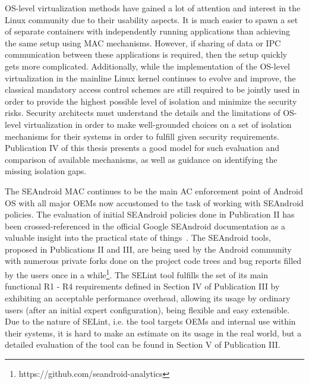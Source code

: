 OS-level virtualization methods have gained a lot of attention and interest in the Linux community due to their usability aspects. It is much easier to spawn a set of separate containers with independently running applications than achieving the same setup using MAC mechanisms. However, if sharing of data or IPC communication between these applications is required, then the setup quickly gets more complicated. Additionally, while the implementation of the OS-level virtualization in the mainline Linux kernel continues to evolve and improve, the classical mandatory access control schemes are still required to be jointly used in order to provide the highest possible level of isolation and minimize the security risks. Security architects must understand the details and the limitations of OS-level virtualization in order to make well-grounded choices on a set of isolation mechanisms for their systems in order to fulfill given security requirements. Publication IV of this thesis presents a good model for such evaluation and comparison of available mechanisms, as well as guidance on identifying the missing isolation gaps. 

The SEAndroid MAC continues to be the main AC enforcement point of Android OS with all major OEMs now accustomed to the task of working with SEAndroid policies. The evaluation of initial SEAndroid policies done in Publication II has been crossed-referenced in the official Google SEAndroid documentation as a valuable insight into the practical state of things~\cite{seanroidsize}. The SEAndroid tools, proposed in Publications II and III, are being used by the Android community with numerous private forks done on the project code trees and bug reports filled by the users once in a while\footnote{https://github.com/seandroid-analytics}. The SELint tool fulfills the set of its main functional R1 - R4 requirements defined in Section IV of Publication III by exhibiting an acceptable performance overhead, allowing its usage by ordinary users (after an initial expert configuration), being flexible and easy extensible. Due to the nature of SELint, i.e. the tool targets OEMs and internal use within their systems, it is hard to make an estimate on its usage in the real world, but a detailed evaluation of the tool can be found in Section V of Publication III. 

